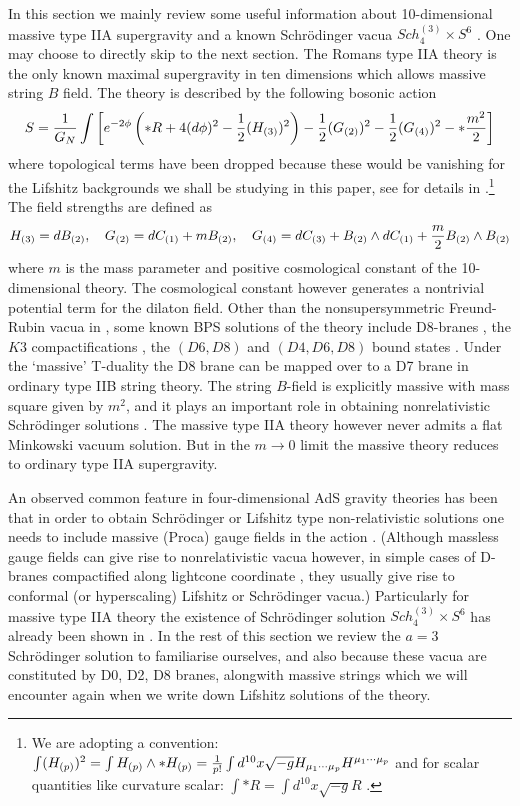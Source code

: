 \documentclass[12pt]{article}
\def\bea{\begin{eqnarray}} \def\eea{\end{eqnarray}} \def\ba{\begin{array}}
\begin{document}
In this section we mainly review some useful information about 
 10-dimensional massive type IIA supergravity  \cite{roma} and a known
Schr\"odinger vacua $Sch_4^{(3)}\times S^6$  \cite{Singh:2009tq}. 
One may choose to directly skip to the next section. 
 The Romans type IIA theory is the only known maximal 
supergravity in ten dimensions which allows massive string $B$  field.
The theory is described  by the following bosonic action
\bea
S={1\over G_N}\int  \bigg[e^{-2\phi}\left(  \ast R + 4
(d\phi)^2 
-{1\over 2} (H_{(3)})^2  \right)
-{1\over 2} (G_{(2)})^2  
-{1\over 2} (G_{(4)})^2  
-\ast{m^2\over 2}  \bigg]
\eea
where  topological terms have been dropped because
these would be  vanishing 
for the Lifshitz backgrounds we shall be studying in this paper, see 
for details in \cite{roma, hs2001}.\footnote{
We are adopting a convention: $
\int (H_{(p)})^2=\int H_{(p)}\wedge\ast H_{(p)}
={1\over p!}\int d^{10}x \sqrt{-g}
H_{\mu_1\cdots\mu_p}H^{\mu_1\cdots\mu_p}$ and for  scalar quantities 
like curvature scalar: 
$\int \ast R=\int d^{10}x \sqrt{-g} R$  .}  The field strengths 
are defined as
\bea
H_{(3)}=dB_{(2)},~~~G_{(2)}=dC_{(1)} +m B_{(2)}, ~~~
G_{(4)}=dC_{(3)} +B_{(2)}\wedge dC_{(1)} + {m\over2} 
B_{(2)}\wedge B_{(2)}
\eea
where $m$ is the mass parameter and positive cosmological constant of
the 10-dimensional theory. The cosmological constant however
 generates   a nontrivial  potential term  for the dilaton 
field. Other than the nonsupersymmetric 
Freund-Rubin  vacua in \cite{roma}, some 
 known BPS solutions of the  theory 
include D8-branes \cite{Pol1, berg, wittd0d8,park00,ohta01,hull}, the
$K3$ compactifications \cite{haack}, the $(D6,D8)$  and  $(D4,D6,D8)$ 
bound states \cite{hs2001, hs1}.
Under the `massive' T-duality \cite{berg} the D8 brane  
 can be mapped over to a D7 brane in ordinary type IIB string theory.  
The string $B$-field  is explicitly massive with mass square given by $m^2$,  
and it plays an important role in obtaining
nonrelativistic Schr\"odinger solutions \cite{Singh:2009tq}. 
The massive type IIA theory however  never admits a flat Minkowski vacuum 
solution. But in the $m\to 0$ limit the massive
theory reduces to ordinary type IIA supergravity. 
   
An observed common  feature in four-dimensional AdS gravity theories
has been that in order to obtain 
Schr\"odinger or Lifshitz type non-relativistic 
solutions one needs to include 
massive (Proca) gauge fields in the action \cite{son,bala}. 
(Although massless gauge fields  can give rise to  nonrelativistic vacua 
however,  in  simple cases of  D-branes
compactified along lightcone coordinate \cite{hs2010,hs2012}, 
they usually give rise to  conformal (or hyperscaling) 
Lifshitz or Schr\"odinger vacua.)   
Particularly for massive
type IIA theory  the existence of  Schr\"odinger solution
 $Sch_4^{(3)}\times S^6$ has already been shown in  
\cite{Singh:2009tq}. 
In the rest of this section we  review the $a=3$ Schr\"odinger solution 
to familiarise ourselves, and also because these vacua 
are  constituted by  D0, D2, D8 branes, alongwith massive strings
which we will encounter  again when we write down Lifshitz solutions
of the theory.
\end{document}
